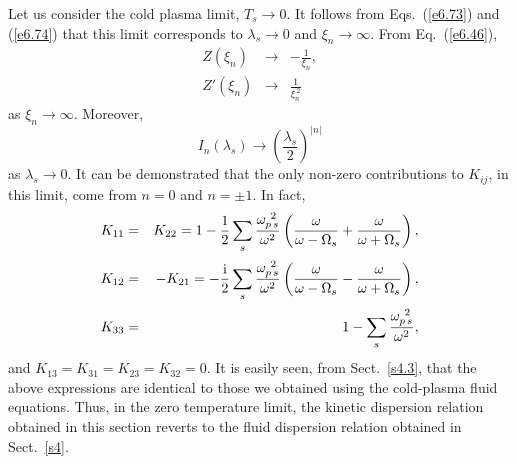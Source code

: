 Let us consider the cold plasma limit, $T_s\rightarrow 0$. It follows from
Eqs.~(\ref{e6.73}) and (\ref{e6.74}) that this limit corresponds to $\lambda_s\rightarrow 0$ and
$\xi_n\rightarrow \infty$. From Eq.~(\ref{e6.46}), 
\begin{eqnarray}\label{e6.75a}
Z(\xi_n) &\rightarrow & -\frac{1}{\xi_n},\\[0.5ex]
Z'(\xi_n) &\rightarrow & \frac{1}{\xi_n^{~2}}\label{e6.75b}
\end{eqnarray}
as $\xi_n\rightarrow\infty$. Moreover,
\begin{equation}\label{e6.76}
I_n(\lambda_s) \rightarrow \left(\frac{\lambda_s}{2}\right)^{|n|}
\end{equation}
as  $\lambda_s\rightarrow 0$. It can be demonstrated  that the
only non-zero contributions to $K_{ij}$, in this limit, come from $n=0$ and
$n=\pm 1$. In fact, 
\begin{eqnarray}
K_{11} &=& K_{22} = 1-\frac{1}{2}\sum_s\frac{\omega_{p\,s}^{~2}}{\omega^2}
\left( \frac{\omega}{\omega-{\Omega}_s} + 
\frac{\omega}{\omega + {\Omega}_s}\right),\\[0.5ex]
K_{12} &=& -K_{21} = -\frac{{\rm i}}{2} \sum_s\frac{\omega_{p\,s}^{~2}}{\omega^2}
\left( \frac{\omega}{\omega-{\Omega}_s} -
\frac{\omega}{\omega + {\Omega}_s}\right),\\[0.5ex]
K_{33} &=& 1-\sum_s\frac{\omega_{p\,s}^{~2}}{\omega^2},
\end{eqnarray}
and $K_{13} = K_{31} = K_{23}=K_{32}=0$. It is easily seen, from Sect.~\ref{s4.3}, that the above
expressions are identical to those we obtained  using the cold-plasma fluid
equations. Thus, in the zero temperature limit, the kinetic
dispersion relation obtained in this section reverts to the fluid dispersion
relation obtained in Sect.~\ref{s4}. 

